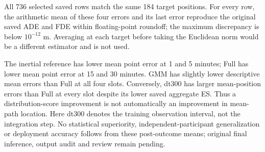 All 736 selected saved rows match the same 184 target positions. For every row, the arithmetic mean of these four errors and its last error reproduce the original saved ADE and FDE within floating-point roundoff; the maximum discrepancy is below $10^{-12}$ m. Averaging at each target before taking the Euclidean norm would be a different estimator and is not used.

The inertial reference has lower mean point error at 1 and 5 minutes; Full has lower mean point error at 15 and 30 minutes. GMM has slightly lower descriptive mean errors than Full at all four slots. Conversely, dt300 has larger mean-position errors than Full at every slot despite its lower saved aggregate ES. Thus a distribution-score improvement is not automatically an improvement in mean-path location. Here dt300 denotes the training observation interval, not the integration step. No statistical superiority, independent-participant generalization or deployment accuracy follows from these post-outcome means; original final inference, output audit and review remain pending.
\FloatBarrier
